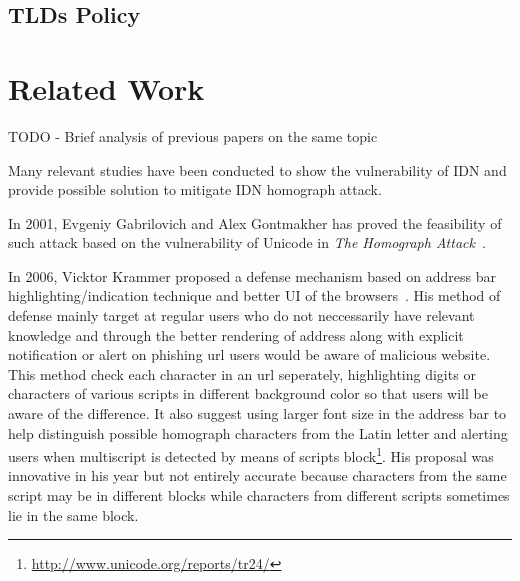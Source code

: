 \documentclass[letterpaper,twocolumn,10pt]{article}
\begin{document}
\subsection{TLDs Policy}

\section{Related Work}
TODO
- Brief analysis of previous papers on the same topic

Many relevant studies have been conducted to show the vulnerability of IDN and provide possible solution to mitigate IDN homograph attack.

In 2001, Evgeniy Gabrilovich and Alex Gontmakher has proved the feasibility of such attack based on the vulnerability of Unicode in \textit{The Homograph Attack}~\cite{theHomoAttack}.

In 2006, Vicktor Krammer proposed a defense mechanism based on address bar highlighting/indication technique and better UI of the browsers~\cite{phishdefenseKV}.
His method of defense mainly target at regular users who do not neccessarily have relevant knowledge and through the better rendering of address along with explicit notification or alert on phishing url users would be aware of malicious website.
This method check each character in an url seperately, highlighting digits or characters of various scripts in different background color so that users will be aware of the difference.
It also suggest using larger font size in the address bar to help distinguish possible homograph characters from the Latin letter and alerting users when multiscript is detected by means of scripts block\footnote{\url{http://www.unicode.org/reports/tr24/}}.
His proposal was innovative in his year but not entirely accurate because characters from the same script may be in different blocks while characters from different scripts sometimes lie in the same block.
\end{document}

